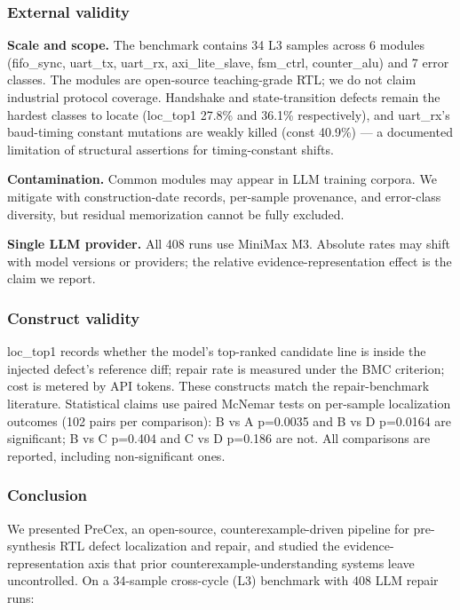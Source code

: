 \documentclass[
  11pt,
]{article}
\begin{document}
\subsubsection{External validity}\label{external-validity}

\textbf{Scale and scope.} The benchmark contains 34 L3 samples across 6 modules (fifo\_sync, uart\_tx, uart\_rx, axi\_lite\_slave, fsm\_ctrl, counter\_alu) and 7 error classes. The modules are open-source teaching-grade RTL; we do not claim industrial protocol coverage. Handshake and state-transition defects remain the hardest classes to locate (loc\_top1 27.8\% and 36.1\% respectively), and uart\_rx's baud-timing constant mutations are weakly killed (const 40.9\%) --- a documented limitation of structural assertions for timing-constant shifts.

\textbf{Contamination.} Common modules may appear in LLM training corpora. We mitigate with construction-date records, per-sample provenance, and error-class diversity, but residual memorization cannot be fully excluded.

\textbf{Single LLM provider.} All 408 runs use MiniMax M3. Absolute rates may shift with model versions or providers; the relative evidence-representation effect is the claim we report.

\subsubsection{Construct validity}\label{construct-validity}

loc\_top1 records whether the model's top-ranked candidate line is inside the injected defect's reference diff; repair rate is measured under the BMC criterion; cost is metered by API tokens. These constructs match the repair-benchmark literature. Statistical claims use paired McNemar tests on per-sample localization outcomes (102 pairs per comparison): B vs A p=0.0035 and B vs D p=0.0164 are significant; B vs C p=0.404 and C vs D p=0.186 are not. All comparisons are reported, including non-significant ones.

\subsubsection{Conclusion}\label{conclusion}

We presented PreCex, an open-source, counterexample-driven pipeline for pre-synthesis RTL defect localization and repair, and studied the evidence-representation axis that prior counterexample-understanding systems leave uncontrolled. On a 34-sample cross-cycle (L3) benchmark with 408 LLM repair runs:
\end{document}
